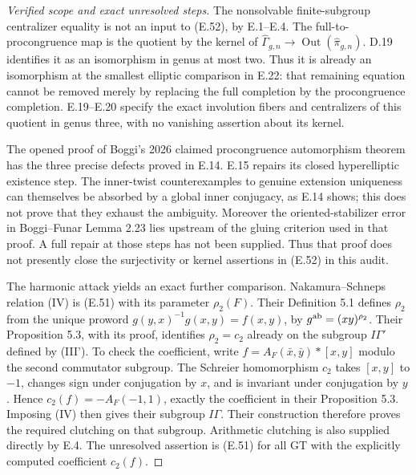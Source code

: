 \begin{proof}[Verified scope and exact unresolved steps]
The nonsolvable finite-subgroup centralizer equality
is not an input to (E.52), by E.1--E.4.  The full-to-
procongruence map is the quotient by the kernel of
$\widehat\Gamma_{g,n}\to\operatorname{Out}
(\widehat\pi_{g,n})$.  D.19 identifies it as an
isomorphism in genus at most two.  Thus it is already
an isomorphism at the smallest elliptic comparison in
E.22: that remaining equation cannot be removed merely
by replacing the full completion by the procongruence
completion.  E.19--E.20 specify the exact involution
fibers and centralizers of this quotient in genus
three, with no vanishing assertion about its kernel.

The opened proof of Boggi's 2026 claimed procongruence
automorphism theorem has the three precise defects
proved in E.14.  E.15 repairs its closed hyperelliptic
existence step.  The inner-twist counterexamples to
genuine extension uniqueness can themselves be
absorbed by a global inner conjugacy, as E.14 shows;
this does not prove that they exhaust the ambiguity.
Moreover the oriented-stabilizer error in
Boggi--Funar Lemma 2.23 lies upstream of the gluing
criterion used in that proof.  A full repair at those
steps has not been supplied.  Thus that proof does
not presently close the surjectivity or kernel
assertions in (E.52) in this audit.

The harmonic attack yields an exact further comparison.
Nakamura--Schneps relation (IV) \cite{ET_NS2000} is (E.51) with its
parameter $\rho_2(F)$.  Their Definition 5.1 defines
$\rho_2$ from the unique proword
$g(y,x)^{-1}g(x,y)=f(x,y)$, by
$g^{\rm ab}=(xy)^{\rho_2}$.  Their Proposition 5.3,
with its proof, identifies $\rho_2=c_2$ already on the subgroup
$I\Gamma\prime$ defined by (III').  To check the coefficient,
write $f=A_F(\bar x,\bar y)*[x,y]$ modulo the second
commutator subgroup.  The Schreier homomorphism $c_2$
takes $[x,y]$ to $-1$, changes sign under conjugation
by $x$, and is invariant under conjugation by $y$.
Hence $c_2(f)=-A_F(-1,1)$, exactly the coefficient
in their Proposition 5.3.  Imposing (IV) then gives
their subgroup $I\Gamma$.
Their construction therefore proves the required
clutching on that subgroup.  Arithmetic clutching is
also supplied directly by E.4.  The unresolved
assertion is (E.51) for all GT with the explicitly
computed coefficient $c_2(f)$.


\end{proof}

